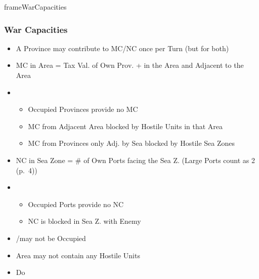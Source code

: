 \documentclass[10pt]{article}
\newlength{\fhWarCapacities} \setlength\fhWarCapacities{18\baselineskip}
\begin{document}
\begin{dynamiccontents*}{frameWarCapacities}\begin{eubox}{\fhWarCapacities}
	\subsubsection*{War Capacities }
	\begin{itemize}
		\item A Province may contribute to MC/NC once per Turn (but for both)
	\end{itemize}	
	\begin{itemize}
		\item MC in Area = Tax Val. of Own Prov. + \vassals in the Area and Adjacent to the Area
		\item {}
		\begin{itemize}
			\item Occupied Provinces provide no MC
			\item MC from Adjacent Area blocked by Hostile Units in that Area
			\item MC from Provinces only Adj. by Sea blocked by Hostile Sea Zones
		\end{itemize}
	\end{itemize}
	\begin{itemize}
		\item NC in Sea Zone = \# of Own Ports facing the Sea Z. (Large Ports count as 2 (p.~4))
		\item {}
		\begin{itemize}
			\item Occupied Ports provide no NC
			\item NC is blocked in Sea Z. with Enemy \ships
		\end{itemize}
	\end{itemize}
\end{eubox}\end{dynamiccontents*}

\begin{itemize}
	\item \town/\vassal may not be Occupied
	\item Area may not contain any Hostile Units
\end{itemize}

\begin{itemize}
	\item Do   
\end{itemize}
\end{document}
